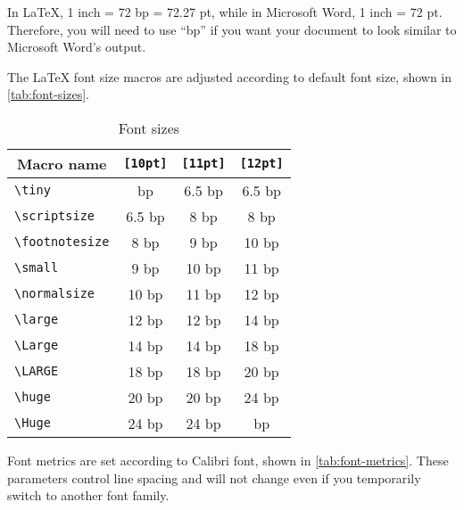 \documentclass[letterpaper]{wordfeel}
\begin{document}
In \LaTeX, 1 inch = 72 bp = 72.27 pt, while in Microsoft Word, 1 inch = 72 pt. Therefore, you will need to use ``bp'' if you want your document to look similar to Microsoft Word's output.

\FloatBarrier

The \LaTeX{} font size macros are adjusted according to default font size, shown in \autoref{tab:font-sizes}.

\begin{table}[htb]
    \centering
    \caption{Font sizes}
    \label{tab:font-sizes}
    \begin{tabular}{lccc}
        \toprule
        \multicolumn{1}{c}{Macro name} & \texttt{[10pt]} & \texttt{[11pt]} & \texttt{[12pt]} \\
        \midrule
        \texttt{\textbackslash{}tiny} & \fontsize{5bp}{6.103515625bp}\selectfont 5 bp & \tiny 6.5 bp & \tiny 6.5 bp \\
        \texttt{\textbackslash{}scriptsize} & \tiny 6.5 bp & \scriptsize 8 bp & \scriptsize 8 bp \\
        \texttt{\textbackslash{}footnotesize} & \scriptsize 8 bp & \footnotesize 9 bp & \small 10 bp \\
        \texttt{\textbackslash{}small} & \footnotesize 9 bp & \small 10 bp & \normalsize 11 bp \\
        \texttt{\textbackslash{}normalsize} & \small 10 bp & \normalsize 11 bp & \large 12 bp \\
        \texttt{\textbackslash{}large} & \large 12 bp & \large 12 bp & \Large 14 bp \\
        \texttt{\textbackslash{}Large} & \Large 14 bp & \Large 14 bp & \LARGE 18 bp \\
        \texttt{\textbackslash{}LARGE} & \LARGE 18 bp & \LARGE 18 bp & \huge 20 bp \\
        \texttt{\textbackslash{}huge} & \huge 20 bp & \huge 20 bp & \Huge 24 bp \\
        \texttt{\textbackslash{}Huge} & \Huge 24 bp & \Huge 24 bp & \fontsize{26bp}{31.73828125bp}\selectfont 26 bp \\
        \bottomrule
    \end{tabular}
\end{table}

\FloatBarrier

Font metrics are set according to Calibri font, shown in \autoref{tab:font-metrics}. These parameters control line spacing and will not change even if you temporarily switch to another font family.
\end{document}
